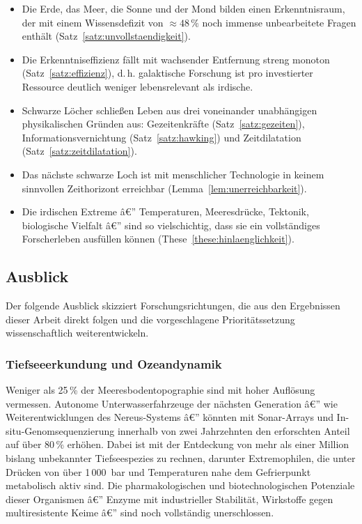 ﻿\documentclass[a4paper,12pt]{article}
\theoremstyle{definition}
\begin{document}
\begin{itemize}
    \item Die Erde, das Meer, die Sonne und der Mond bilden einen Erkenntnisraum,
          der mit einem Wissensdefizit von $\approx 48\,\%$ noch immense
          unbearbeitete Fragen enthält (Satz~\ref{satz:unvollstaendigkeit}).
    \item Die Erkenntniseffizienz fällt mit wachsender Entfernung streng monoton
          (Satz~\ref{satz:effizienz}), d.\,h. galaktische Forschung ist pro
          investierter Ressource deutlich weniger lebensrelevant als irdische.
    \item Schwarze Löcher schließen Leben aus drei voneinander unabhängigen
          physikalischen Gründen aus: Gezeitenkräfte (Satz~\ref{satz:gezeiten}),
          Informationsvernichtung (Satz~\ref{satz:hawking}) und Zeitdilatation
          (Satz~\ref{satz:zeitdilatation}).
    \item Das nächste schwarze Loch ist mit menschlicher Technologie in keinem
          sinnvollen Zeithorizont erreichbar (Lemma~\ref{lem:unerreichbarkeit}).
    \item Die irdischen Extreme â€” Temperaturen, Meeresdrücke, Tektonik,
          biologische Vielfalt â€” sind so vielschichtig, dass sie ein
          vollständiges Forscherleben ausfüllen können
          (These~\ref{these:hinlaenglichkeit}).
\end{itemize}

\subsection{Ausblick}

Der folgende Ausblick skizziert Forschungsrichtungen, die aus den Ergebnissen
dieser Arbeit direkt folgen und die vorgeschlagene Prioritätssetzung
wissenschaftlich weiterentwickeln.

\subsubsection{Tiefseeerkundung und Ozeandynamik}

Weniger als 25\,\% der Meeresbodentopographie sind mit hoher Auflösung
vermessen. Autonome Unterwasserfahrzeuge der nächsten Generation â€” wie
Weiterentwicklungen des Nereus-Systems â€” könnten mit Sonar-Arrays und
In-situ-Genomsequenzierung innerhalb von zwei Jahrzehnten den erforschten
Anteil auf über 80\,\% erhöhen. Dabei ist mit der Entdeckung von mehr als
einer Million bislang unbekannter Tiefseespezies zu rechnen, darunter
Extremophilen, die unter Drücken von über 1\,000~bar und Temperaturen nahe
dem Gefrierpunkt metabolisch aktiv sind. Die pharmakologischen und
biotechnologischen Potenziale dieser Organismen â€” Enzyme mit industrieller
Stabilität, Wirkstoffe gegen multiresistente Keime â€” sind noch vollständig
unerschlossen.
\end{document}
